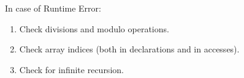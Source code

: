       In case of Runtime Error:
      \begin{enumerate}
        \item Check divisions and modulo operations.
        \item Check array indices (both in declarations and in accesses).
        \item Check for infinite recursion.
      \end{enumerate}
